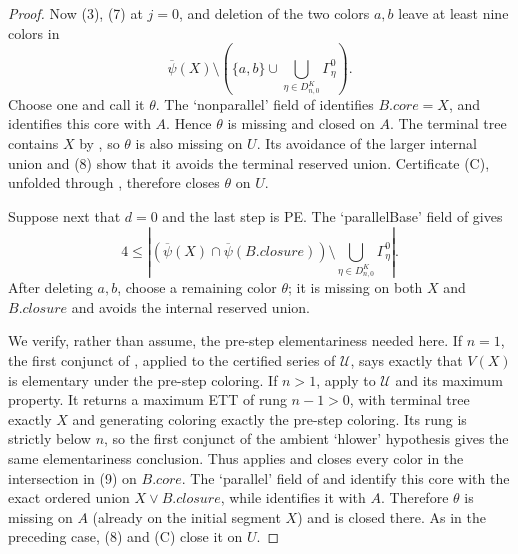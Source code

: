 \begin{proof}
Now (3), (7) at $j=0$, and deletion of the two colors $a,b$ leave at
least nine colors in
\[
 \overline\psi(X)\setminus
 \left(\{a,b\}\cup
   \bigcup_{\eta\in D^K_{n,0}}\Gamma^0_\eta\right).
\]
Choose one and call it $\theta$.  The `nonparallel' field of
 identifies $B.\mathit{core}=X$, and
 identifies this core with $A$.  Hence
$\theta$ is missing and closed on $A$.  The terminal tree contains $X$
by , so $\theta$ is also missing on $U$.
Its avoidance of the larger internal union and (8) show that it avoids
the terminal reserved union.  Certificate (C), unfolded through
, therefore closes $\theta$ on $U$.

Suppose next that $d=0$ and the last step is PE.  The `parallelBase'
field of  gives
\[
 4\leq\left|
 (\overline\psi(X)\cap\overline\psi(B.\mathit{closure}))
 \setminus\bigcup_{\eta\in D^K_{n,0}}\Gamma^0_\eta
 \right|.                                                     \tag{9}
\]
After deleting $a,b$, choose a remaining color $\theta$; it is missing
on both $X$ and $B.\mathit{closure}$ and avoids the internal reserved
union.

We verify, rather than assume, the pre-step elementariness needed here.
If $n=1$, the first conjunct of , applied
to the certified series of $\mathcal U$, says exactly that $V(X)$ is
elementary under the pre-step coloring.  If $n>1$, apply
 to $\mathcal U$ and its maximum
property.  It returns a maximum ETT of rung $n-1>0$, with terminal tree
exactly $X$ and generating coloring exactly the pre-step coloring.  Its
rung is strictly below $n$, so the first conjunct of the ambient `hlower'
hypothesis gives the same elementariness conclusion.  Thus
 applies and closes every color in
the intersection in (9) on $B.\mathit{core}$.  The `parallel' field of
 and  identify this
core with the exact ordered union $X\vee B.\mathit{closure}$, while
 identifies it with $A$.  Therefore
$\theta$ is missing on $A$ (already on the initial segment $X$) and is
closed there.  As in the preceding case, (8) and (C) close it on $U$.


\end{proof}
